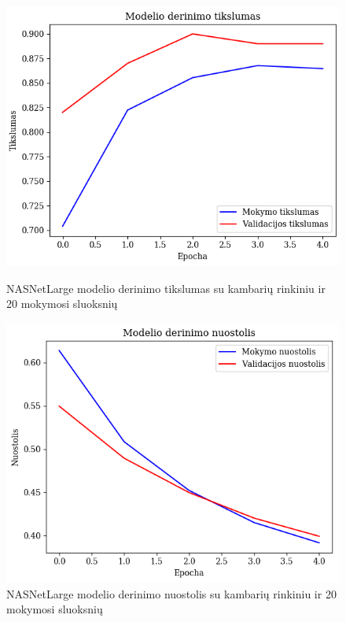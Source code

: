 \documentclass{VUMIFPSbakalaurinis}
\begin{document}
\begin{figure}[H]
    \centering
    \begin{minipage}[b]{0.48\textwidth}
      \includegraphics[width=\textwidth]{img/GrapthsNEW/Large/room/20/Acc_R_L_20.png}
      \caption{NASNetLarge modelio derinimo tikslumas su kambarių rinkiniu ir 20 mokymosi sluoksnių}
    \end{minipage}
    \hspace{2mm}
    \begin{minipage}[b]{0.48\textwidth}
      \includegraphics[width=\textwidth]{img/GrapthsNEW/Large/room/20/Loss_R_L_20.png}
      \caption{NASNetLarge modelio derinimo nuostolis su kambarių rinkiniu ir 20 mokymosi sluoksnių}
    \end{minipage}
\end{figure}
\end{document}
